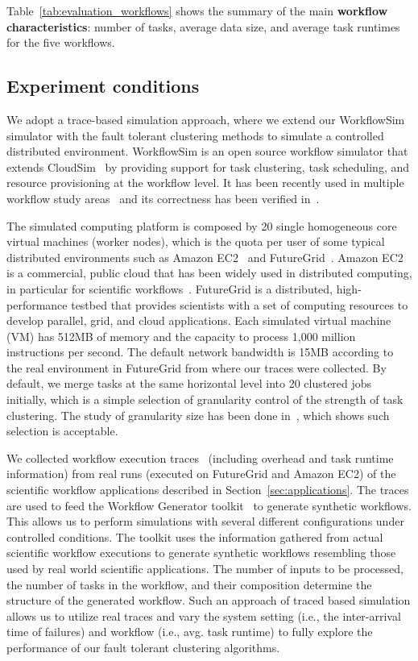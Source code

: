 \documentclass{IOS-Book-Article}
\begin{document}
Table~\ref{tab:evaluation_workflows} shows the summary of the main \textbf{workflow characteristics}: number of tasks, average data size, and average task runtimes for the five workflows. 


\subsection{Experiment conditions}
\label{sec:experiment_conditions}
We adopt a trace-based simulation approach, where we extend our WorkflowSim~\cite{WorkflowSim} simulator with the fault tolerant clustering methods to simulate a controlled distributed environment. WorkflowSim is an open source workflow simulator that extends CloudSim~\cite{Calheiros2011} by providing support for task clustering, task scheduling, and resource provisioning at the workflow level. It has been recently used in multiple workflow study areas~\cite{WorkflowSim,Chen2012, jrad2013broker} and its correctness has been verified in~\cite{WorkflowSim}. 

The simulated computing platform is composed by 20 single homogeneous core virtual machines (worker nodes), which is the quota per user of some typical distributed environments such as Amazon EC2~\cite{AmazonAWS} and FutureGrid~\cite{FutureGrid}. Amazon EC2 is a commercial, public cloud that has been widely used in distributed computing, in particular for scientific workflows~\cite{Berriman2010}. FutureGrid is a distributed, high-performance testbed that provides scientists with a set of computing resources to develop parallel, grid, and cloud applications. Each simulated virtual machine (VM) has 512MB of memory and the capacity to process 1,000 million instructions per second. The default network bandwidth is 15MB according to the real environment in FutureGrid from where our traces were collected. By default, we merge tasks at the same horizontal level into 20 clustered jobs initially, which is a simple selection of granularity control of the strength of task clustering. The study of granularity size has been done in~\cite{Chen2013b}, which shows such selection is acceptable.

We collected workflow execution traces~\cite{Juve2013, Chen2011} (including overhead and task runtime information) from real runs (executed on FutureGrid and Amazon EC2) of the scientific workflow applications described in Section~\ref{sec:applications}. The traces are used to feed the Workflow Generator toolkit~\cite{WorkflowGenerator} to generate synthetic workflows. This allows us to perform simulations with several different configurations under controlled conditions. The toolkit uses the information gathered from actual scientific workflow executions to generate synthetic workflows resembling those used by real world scientific applications. The number of inputs to be processed, the number of tasks in the workflow, and their composition determine the structure of the generated workflow. Such an approach of traced based simulation allows us to utilize real traces and vary the system setting (i.e., the inter-arrival time of failures) and workflow (i.e., avg. task runtime) to fully explore the performance of our fault tolerant clustering algorithms. 
\end{document}
